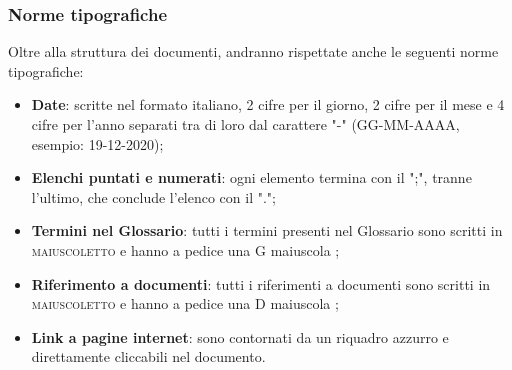 	\subsubsection{Norme tipografiche}
	Oltre alla struttura dei documenti, andranno rispettate anche le seguenti norme tipografiche:
	\begin{itemize}
		\item \textbf{Date}: scritte nel formato italiano, 2 cifre per il giorno, 2 cifre per il mese e 4 cifre per l'anno separati tra di loro dal carattere "-" (GG-MM-AAAA, esempio: 19-12-2020);
		\item \textbf{Elenchi puntati e numerati}: ogni elemento termina con il ";", tranne l'ultimo, che conclude l'elenco con il ".";
		\item \textbf{Termini nel Glossario}: tutti i termini presenti nel Glossario sono scritti in \textsc{maiuscoletto} e hanno a pedice una G maiuscola \glock{};
		\item \textbf{Riferimento a documenti}: tutti i riferimenti a documenti sono scritti in \textsc{maiuscoletto} e hanno a pedice una D maiuscola \dext{};
		\item \textbf{Link a pagine internet}: sono contornati da un riquadro azzurro e direttamente cliccabili nel documento.
	\end{itemize}

